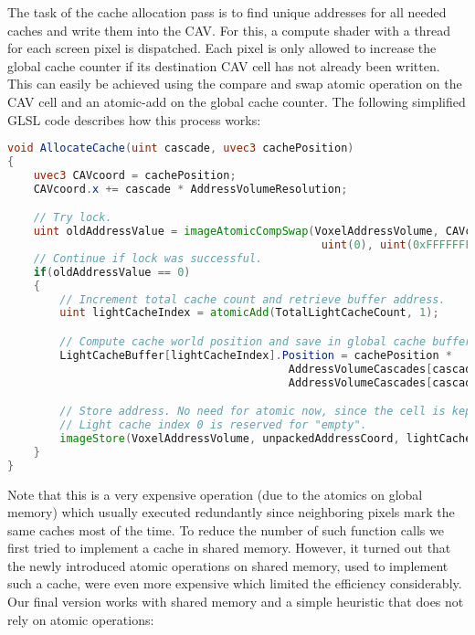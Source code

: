 \documentclass[thesis.tex]{subfiles}
\begin{document}
The task of the cache allocation pass is to find unique addresses for all needed caches and write them into the CAV.
For this, a compute shader with a thread for each screen pixel is dispatched.
Each pixel is only allowed to increase the global cache counter if its destination CAV cell has not already been written.
This can easily be achieved using the compare and swap atomic operation on the CAV cell and an atomic-add on the global cache counter.
The following simplified GLSL code describes how this process works:
\begin{lstlisting}[language=GLSL]
void AllocateCache(uint cascade, uvec3 cachePosition)
{
	uvec3 CAVcoord = cachePosition;
	CAVcoord.x += cascade * AddressVolumeResolution;

	// Try lock.
	uint oldAddressValue = imageAtomicCompSwap(VoxelAddressVolume, CAVcoord, 
                                                uint(0), uint(0xFFFFFFFF));
	// Continue if lock was successful.
	if(oldAddressValue == 0)
	{
		// Increment total cache count and retrieve buffer address.
		uint lightCacheIndex = atomicAdd(TotalLightCacheCount, 1);

		// Compute cache world position and save in global cache buffer.
		LightCacheBuffer[lightCacheIndex].Position = cachePosition *
		                                   AddressVolumeCascades[cascade].WorldVoxelSize +
		                                   AddressVolumeCascades[cascade].Min;

		// Store address. No need for atomic now, since the cell is kept locked.
		// Light cache index 0 is reserved for "empty".
		imageStore(VoxelAddressVolume, unpackedAddressCoord, lightCacheIndex + 1);
	}
}
\end{lstlisting}
Note that this is a very expensive operation (due to the atomics on global memory) which usually executed redundantly since neighboring pixels mark the same caches most of the time.
To reduce the number of such function calls we first tried to implement a cache in shared memory.
However, it turned out that the newly introduced atomic operations on shared memory, used to implement such a cache, were even more expensive which limited the efficiency considerably.
\\
Our final version works with shared memory and a simple heuristic that does not rely on atomic operations:
\end{document}
